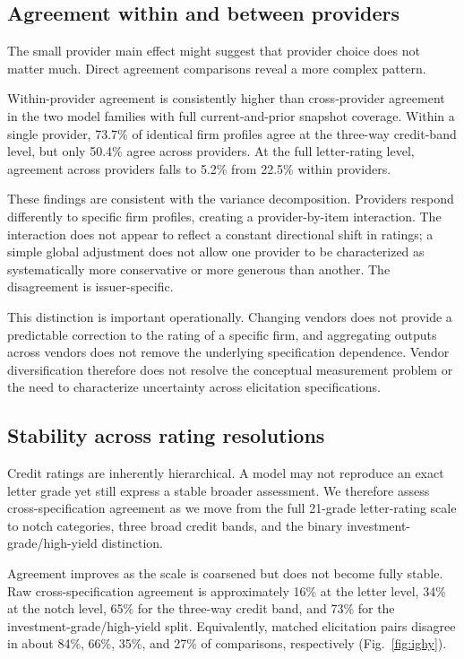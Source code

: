 \documentclass[pdflatex,sn-nature,lineno]{sn-jnl}
\theoremstyle{thmstyleone}
\begin{document}
\subsection{Agreement within and between providers}
The small provider main effect might suggest that provider choice does not matter much. Direct agreement
comparisons reveal a more complex pattern.

Within-provider agreement is consistently higher than cross-provider agreement in the two model families with
full current-and-prior snapshot coverage. Within a single provider, 73.7\% of identical firm profiles
agree at the three-way credit-band level, but only 50.4\% agree across providers. At the full
letter-rating level, agreement across providers falls to 5.2\% from 22.5\% within providers.

These findings are consistent with the variance decomposition. Providers respond differently to specific
firm profiles, creating a provider-by-item interaction. The interaction does not appear to reflect a constant
directional shift in ratings; a simple global adjustment does not allow one provider to be
characterized as systematically more conservative or more generous than another. The disagreement is
issuer-specific.

This distinction is important operationally. Changing vendors does not provide a predictable correction
to the rating of a specific firm, and aggregating outputs across vendors does not remove the underlying
specification dependence. Vendor diversification therefore does not resolve the conceptual measurement
problem or the need to characterize uncertainty across elicitation specifications.

\subsection{Stability across rating resolutions}
Credit ratings are inherently hierarchical. A model may not reproduce an exact letter grade yet still
express a stable broader assessment. We therefore assess cross-specification agreement as we move from
the full 21-grade letter-rating scale to notch categories, three broad credit bands, and the binary
investment-grade/high-yield distinction.

Agreement improves as the scale is coarsened but does not become fully stable. Raw cross-specification
agreement is approximately 16\% at the letter level, 34\% at the notch level, 65\% for the three-way
credit band, and 73\% for the investment-grade/high-yield split. Equivalently, matched elicitation pairs
disagree in about 84\%, 66\%, 35\%, and 27\% of comparisons, respectively (Fig.~\ref{fig:ighy}).
\end{document}
